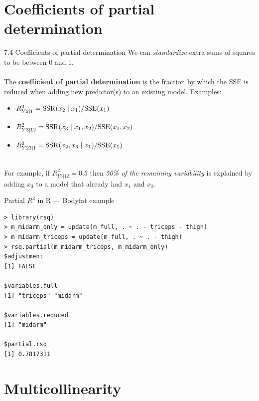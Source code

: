 \documentclass{beamer}
\begin{document}
\section{Coefficients of partial determination}

\begin{frame}{7.4 Coefficients of partial determination}
We can {\it standardize} extra sums of squares to be between 0 and 1.\\~\\

\pause The \textbf{coefficient of partial determination} is the fraction by which the SSE is reduced when adding new predictor(s) to an existing model. \pause Examples:
\begin{itemize}
\item\pause $R^2_{Y2\mid1}={\rm SSR}(x_2\mid x_1)/{\rm SSE}(x_1)$
\item\pause $R^2_{Y3\mid12}={\rm SSR}(x_3\mid x_1,x_2)/{\rm SSE}(x_1,x_2)$
\item\pause $R^2_{Y23\mid1}={\rm SSR}(x_2,x_3\mid x_1)/{\rm SSE}(x_1)$\\~\\
\end{itemize}


\pause For example, if $R^2_{Y3|12}=0.5$ then {\it 50\% of the remaining variability} is explained by adding $x_3$ to a model that already had $x_1$ and $x_2$.
\end{frame}

\begin{frame}[fragile]{Partial $R^2$ in {\sc R} --- Bodyfat example}
\begin{verbatim}
> library(rsq)
> m_midarm_only = update(m_full, . ~ . - triceps - thigh)
> m_midarm_triceps = update(m_full, . ~ . - thigh)
> rsq.partial(m_midarm_triceps, m_midarm_only)
$adjustment
[1] FALSE

$variables.full
[1] "triceps" "midarm" 

$variables.reduced
[1] "midarm"

$partial.rsq
[1] 0.7817311
\end{verbatim}
\end{frame}


\section{Multicollinearity}
\end{document}
